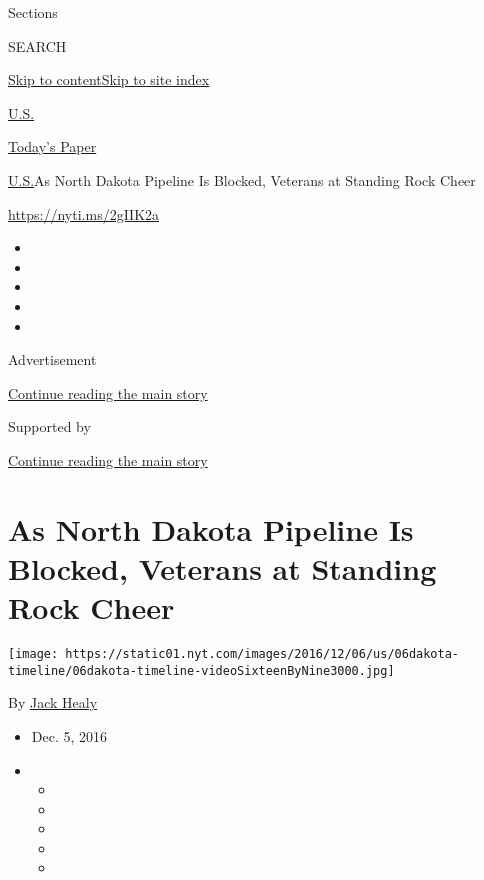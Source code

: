 Sections

SEARCH

\protect\hyperlink{site-content}{Skip to
content}\protect\hyperlink{site-index}{Skip to site index}

\href{https://www.nytimes.com/section/us}{U.S.}

\href{https://myaccount.nytimes.com/auth/login?response_type=cookie\&client_id=vi}{}

\href{https://www.nytimes.com/section/todayspaper}{Today's Paper}

\href{/section/us}{U.S.}\textbar{}As North Dakota Pipeline Is Blocked,
Veterans at Standing Rock Cheer

\url{https://nyti.ms/2gIIK2a}

\begin{itemize}
\item
\item
\item
\item
\item
\end{itemize}

Advertisement

\protect\hyperlink{after-top}{Continue reading the main story}

Supported by

\protect\hyperlink{after-sponsor}{Continue reading the main story}

\hypertarget{as-north-dakota-pipeline-is-blocked-veterans-at-standing-rock-cheer}{%
\section{As North Dakota Pipeline Is Blocked, Veterans at Standing Rock
Cheer}\label{as-north-dakota-pipeline-is-blocked-veterans-at-standing-rock-cheer}}

\texttt{[image: https://static01.nyt.com/images/2016/12/06/us/06dakota-timeline/06dakota-timeline-videoSixteenByNine3000.jpg]}

By \href{http://www.nytimes.com/by/jack-healy}{Jack Healy}

\begin{itemize}
\item
  Dec. 5, 2016
\item
  \begin{itemize}
  \item
  \item
  \item
  \item
  \item
  \end{itemize}
\end{itemize}

